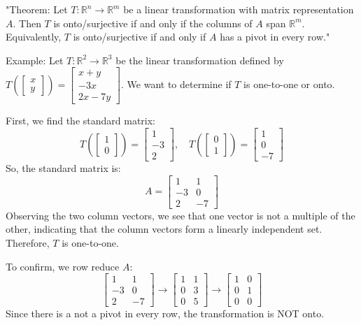 \documentclass{article}
\begin{document}
"Theorem: Let $T: \mathbb{R}^n \to \mathbb{R}^m$ be a linear transformation with matrix representation $A$. Then $T$ is onto/surjective if and only if the columns of $A$ span $\mathbb{R}^m$. Equivalently, $T$ is onto/surjective if and only if $A$ has a pivot in every row."


Example: Let $T: \mathbb{R}^2 \to \mathbb{R}^3$ be the linear transformation defined by $T\left(\begin{bmatrix} x \\ y \end{bmatrix}\right) = \begin{bmatrix} x+y \\ -3x \\ 2x-7y \end{bmatrix}$. We want to determine if $T$ is one-to-one or onto.

First, we find the standard matrix:
\[ T\left(\begin{bmatrix} 1 \\ 0 \end{bmatrix}\right) = \begin{bmatrix} 1 \\ -3 \\ 2 \end{bmatrix}, \quad T\left(\begin{bmatrix} 0 \\ 1 \end{bmatrix}\right) = \begin{bmatrix} 1 \\ 0 \\ -7 \end{bmatrix} \]
So, the standard matrix is:
\[ A = \begin{bmatrix} 1 & 1 \\ -3 & 0 \\ 2 & -7 \end{bmatrix} \]
Observing the two column vectors, we see that one vector is not a multiple of the other, indicating that the column vectors form a linearly independent set. Therefore, $T$ is one-to-one.

To confirm, we row reduce $A$:
\[ \begin{bmatrix} 1 & 1 \\ -3 & 0 \\ 2 & -7 \end{bmatrix} \rightarrow \begin{bmatrix} 1 & 1 \\ 0 & 3 \\ 0 & 5 \end{bmatrix} \rightarrow \begin{bmatrix} 1 & 0 \\ 0 & 1 \\ 0 & 0 \end{bmatrix} \]
Since there is a not a pivot in every row, the transformation is NOT onto.
\end{document}
